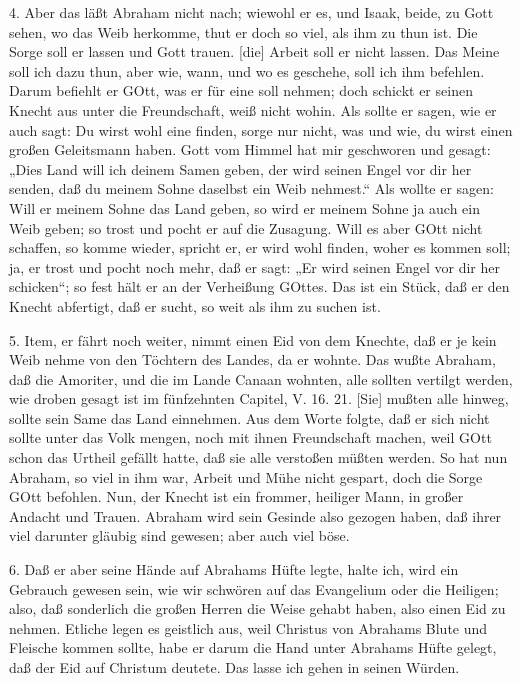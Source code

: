 4. Aber das läßt Abraham nicht nach; wiewohl er es, und Isaak, beide, zu Gott sehen, wo das Weib herkomme, thut er doch so viel, als ihm zu thun ist. Die Sorge soll er lassen und Gott trauen. [die] Arbeit soll er nicht lassen. Das Meine soll ich dazu thun, aber wie, wann, und wo es geschehe, soll ich ihm befehlen. Darum befiehlt er GOtt, was er für eine soll nehmen; doch schickt er seinen Knecht aus unter die Freundschaft, weiß nicht wohin. Als sollte er sagen, wie er auch sagt: Du wirst wohl eine finden, sorge nur nicht, was und wie, du wirst einen großen Geleitsmann haben. Gott vom Himmel hat mir geschworen und gesagt: „Dies Land will ich deinem Samen geben, der wird seinen Engel vor dir her senden, daß du meinem Sohne daselbst ein Weib nehmest.“ Als wollte er sagen: Will er meinem Sohne das Land geben, so wird er meinem Sohne ja auch ein Weib geben; so trost und pocht er auf die Zusagung. Will es aber GOtt nicht schaffen, so komme wieder, spricht er, er wird wohl finden, woher es kommen soll; ja, er trost und pocht noch mehr, daß er sagt: „Er wird seinen Engel vor dir her schicken“; so fest hält er an der Verheißung GOttes. Das ist ein Stück, daß er den Knecht abfertigt, daß er sucht, so weit als ihm zu suchen ist.

5. Item, er fährt noch weiter, nimmt einen Eid von dem Knechte, daß er je kein Weib nehme von den Töchtern des Landes, da er wohnte. Das wußte Abraham, daß die Amoriter, und die im Lande Canaan wohnten, alle sollten vertilgt werden, wie droben gesagt ist im fünfzehnten Capitel, V. 16. 21. [Sie] mußten alle hinweg, sollte sein Same das Land einnehmen. Aus dem Worte folgte, daß er sich nicht sollte unter das Volk mengen, noch mit ihnen Freundschaft machen, weil GOtt schon das Urtheil gefällt hatte, daß sie alle verstoßen müßten werden. So hat nun Abraham, so viel in ihm war, Arbeit und Mühe nicht gespart, doch die Sorge GOtt befohlen. Nun, der Knecht ist ein frommer, heiliger Mann, in großer Andacht und Trauen. Abraham wird sein Gesinde also gezogen haben, daß ihrer viel darunter gläubig sind gewesen; aber auch viel böse.

6. Daß er aber seine Hände auf Abrahams Hüfte legte, halte ich, wird ein Gebrauch gewesen sein, wie wir schwören auf das Evangelium oder die Heiligen; also, daß sonderlich die großen Herren die Weise gehabt haben, also einen Eid zu nehmen. Etliche legen es geistlich aus, weil Christus von Abrahams Blute und Fleische kommen sollte, habe er darum die Hand unter Abrahams Hüfte gelegt, daß der Eid auf Christum deutete. Das lasse ich gehen in seinen Würden.

